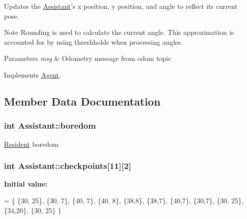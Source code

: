 Updates the \hyperlink{classAssistant}{Assistant}'s x position, y position, and angle to reflect its current pose. 

\begin{DoxyNote}{Note}
Rounding is used to calculate the current angle. This approximation is accounted for by using threshholds when processing angles. 
\end{DoxyNote}

\begin{DoxyParams}{Parameters}
{\em msg} & Odometry message from odom topic \\
\hline
\end{DoxyParams}


Implements \hyperlink{classAgent}{Agent}.



\subsection{Member Data Documentation}
\hypertarget{classAssistant_a1f237fcda74950177c10cc26ea778863}{
\subsubsection[{boredom}]{\setlength{\rightskip}{0pt plus 5cm}int Assistant\-::boredom\hspace{0.3cm}{\ttfamily [protected]}}}\label{classAssistant_a1f237fcda74950177c10cc26ea778863}
\hyperlink{classResident}{Resident} boredom \hypertarget{classAssistant_a31e94c37f8c6509b81c5c92ad5213e3f}{
\subsubsection[{checkpoints}]{\setlength{\rightskip}{0pt plus 5cm}int Assistant\-::checkpoints\mbox{[}11\mbox{]}\mbox{[}2\mbox{]}\hspace{0.3cm}{\ttfamily [protected]}}}\label{classAssistant_a31e94c37f8c6509b81c5c92ad5213e3f}
{\bfseries Initial value\-:}
\begin{DoxyCode}
= \{  
        \{30, 25\},
        \{30, 7\}, 
        \{40, 7\},
        \{40, 8\},
        \{38,8\},
        \{38,7\},
        \{40,7\},
        \{30,7\},
        \{30, 25\},
        \{34,20\},
        \{30, 25\}
        \}
\end{DoxyCode}


